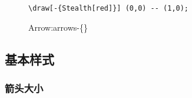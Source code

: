 \begin{itemize}
    \begin{figure}[H]
        \centering
        \begin{minipage}{0.35\linewidth}
            \centering
        \end{minipage}
        \begin{minipage}{0.55\linewidth}
            \begin{lstlisting}[style = latex-side]
    \draw[-{Stealth[red]}] (0,0) -- (1,0);
            \end{lstlisting}
        \end{minipage}
        \caption{Arrow:arrows-\{\}}
    \end{figure}
\end{itemize}

\subsection{基本样式}
\subsubsection{箭头大小}

